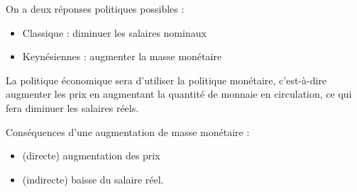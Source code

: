 	
%	
%	
%	
	
	
	On a deux réponses politiques possibles :
	
	\begin{itemize}
		\item Classique : diminuer les salaires nominaux
		\item Keynésiennes : augmenter la masse monétaire
	\end{itemize}
	La politique économique sera d'utiliser la politique monétaire, c'est-à-dire augmenter les prix en augmentant la quantité de monnaie en circulation, ce qui fera diminuer les salaires réels.
	
	Conséquences d'une augmentation de masse monétaire :
	
	\begin{itemize}
		\item (directe) augmentation des prix
		\item (indirecte) baisse du salaire réel.
	\end{itemize}
	
